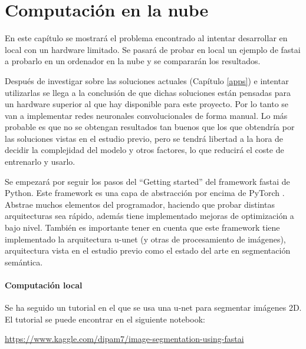 \chapter{Computación en la nube}\label{cloudcomputing}

En este capítulo se mostrará el problema encontrado al intentar desarrollar en local con un hardware limitado. Se pasará de probar en local un ejemplo de fastai a probarlo en un ordenador en la nube y se compararán los resultados.

Después de investigar sobre las soluciones actuales (Capítulo \ref{apps}) e intentar utilizarlas se llega a la conclusión de que dichas soluciones están pensadas para un hardware superior al que hay disponible para este proyecto. Por lo tanto se van a implementar redes neuronales convolucionales de forma manual. Lo más probable es que no se obtengan resultados tan buenos que los que obtendría por las soluciones vistas en el estudio previo, pero se tendrá libertad a la hora de decidir la complejidad del modelo y otros factores, lo que reducirá el coste de entrenarlo y usarlo.

Se empezará por seguir los pasos del “Getting started” del framework fastai \cite{Howard2018} de Python. Este framework es una capa de abstracción por encima de PyTorch \cite{Paszke2019}. Abstrae muchos elementos del programador, haciendo que probar distintas arquitecturas sea rápido, además tiene implementado mejoras de optimización a bajo nivel. También es importante tener en cuenta que este framework tiene implementado la arquitectura u-unet (y otras de procesamiento de imágenes), arquitectura vista en el estudio previo como el estado del arte en segmentación semántica.

\subsubsection{Computación local}\label{sec:local_dev}

Se ha seguido un tutorial en el que se usa una u-net para segmentar imágenes 2D. El tutorial se puede encontrar en el siguiente notebook:

\url{https://www.kaggle.com/dipam7/image-segmentation-using-fastai}

